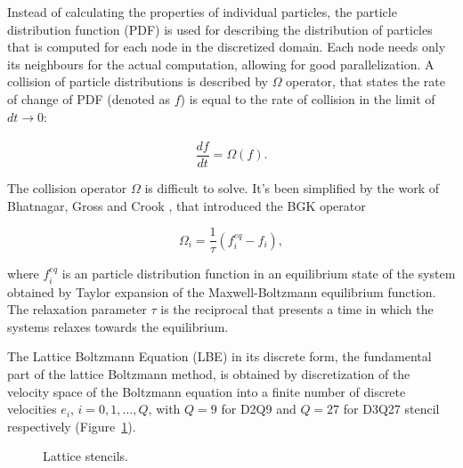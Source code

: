 Instead of calculating the properties of individual particles, the particle distribution function (PDF) is used for describing the distribution of particles that is computed for each node in the discretized domain. Each node needs only its neighbours for the actual computation, allowing for good parallelization. A collision of particle distributions is described by $\Omega$ operator, that states the rate of change of PDF (denoted as $f$) is equal to the rate of collision in the limit of $dt \xrightarrow[]{} 0$:

\begin{equation}
	\label{eq:collision-operator}
	\frac{df}{dt} = \Omega(f).
\end{equation}

The collision operator $\Omega$ is difficult to solve. It's been simplified by the work of Bhatnagar, Gross and Crook \citep{bhatnagarModelCollisionProcesses1954}, that introduced the BGK operator

\begin{equation}
	\label{eq:bgk-operator}
	\Omega_i = \frac{1}{\tau}(f^{eq}_i - f_i),
\end{equation}

where $f^{eq}_i $ is an particle distribution function in an equilibrium state of the system obtained by Taylor expansion of the Maxwell-Boltzmann equilibrium function. The relaxation parameter $\tau$ is the reciprocal that presents a time in which the systems relaxes towards the equilibrium.

The Lattice Boltzmann Equation (LBE) in its discrete form, the fundamental part of the lattice Boltzmann method, is obtained by discretization of the velocity space of the Boltzmann equation into a finite number of discrete velocities $e_i$, $i = 0,1,...,Q$, with $Q = 9$ for D2Q9 and $Q = 27$ for D3Q27 stencil respectively (Figure~\ref{fig:stencils}). 

\begin{figure}[!ht]
	\centering
	\captionsetup{justification=centering}
	 \qquad
	\caption{Lattice stencils.}
	\label{fig:stencils}
\end{figure}

